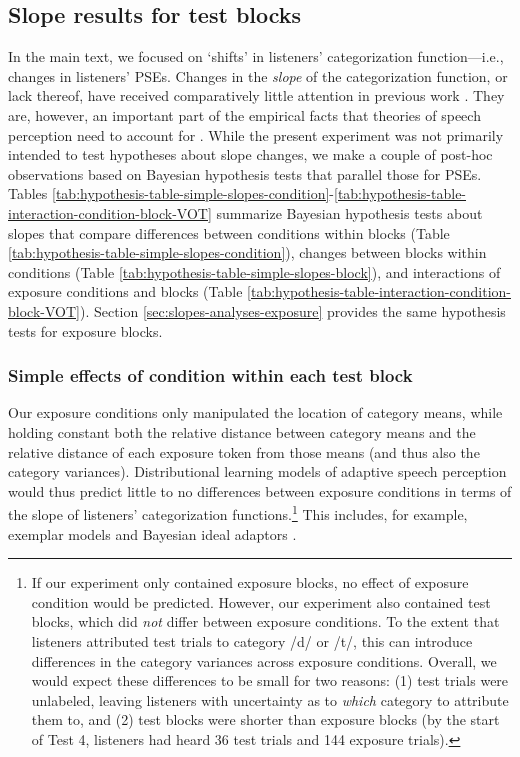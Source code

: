 \documentclass[
  11pt,
  man,mask,floatsintext]{apa6}
\begin{document}
\pagebreak

\subsection{Slope results for test blocks}\label{sec:slopes-analyses-test}

In the main text, we focused on `shifts' in listeners' categorization function---i.e., changes in listeners' PSEs. Changes in the \emph{slope} of the categorization function, or lack thereof, have received comparatively little attention in previous work \autocites[though see][]{clayards2008,theodore-monto2019}. They are, however, an important part of the empirical facts that theories of speech perception need to account for \autocite[see also][]{kleinschmidt2020}. While the present experiment was not primarily intended to test hypotheses about slope changes, we make a couple of post-hoc observations based on Bayesian hypothesis tests that parallel those for PSEs. Tables \ref{tab:hypothesis-table-simple-slopes-condition}-\ref{tab:hypothesis-table-interaction-condition-block-VOT} summarize Bayesian hypothesis tests about slopes that compare differences between conditions within blocks (Table \ref{tab:hypothesis-table-simple-slopes-condition}), changes between blocks within conditions (Table \ref{tab:hypothesis-table-simple-slopes-block}), and interactions of exposure conditions and blocks (Table \ref{tab:hypothesis-table-interaction-condition-block-VOT}). Section \ref{sec:slopes-analyses-exposure} provides the same hypothesis tests for exposure blocks.

\subsubsection{Simple effects of condition within each test block}\label{simple-effects-of-condition-within-each-test-block}

Our exposure conditions only manipulated the location of category means, while holding constant both the relative distance between category means and the relative distance of each exposure token from those means (and thus also the category variances). Distributional learning models of adaptive speech perception would thus predict little to no differences between exposure conditions in terms of the slope of listeners' categorization functions.\footnote{If our experiment only contained exposure blocks, no effect of exposure condition would be predicted. However, our experiment also contained test blocks, which did \emph{not} differ between exposure conditions. To the extent that listeners attributed test trials to category /d/ or /t/, this can introduce differences in the category variances across exposure conditions. Overall, we would expect these differences to be small for two reasons: (1) test trials were unlabeled, leaving listeners with uncertainty as to \emph{which} category to attribute them to, and (2) test blocks were shorter than exposure blocks (by the start of Test 4, listeners had heard 36 test trials and 144 exposure trials).} This includes, for example, exemplar models \autocite{johnson1997} and Bayesian ideal adaptors \autocite{kleinschmidt-jaeger2015}.
\end{document}
